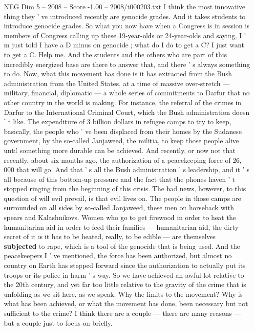 \begin{textsample}{NEG Dim 5 – 2008 – Score -1.00 – 2008/t000203.txt}
I think the most innovative thing they ' ve introduced recently are genocide grades.
And it takes students to introduce genocide grades.
So what you now have when a Congress is in session is members of Congress calling up these 19-year-olds or 24-year-olds and saying, I ' m just told I have a D minus on genocide ; what do I do to get a C?
I just want to get a C.
Help me.
And the students and the others who are part of this incredibly energized base are there to answer that, and there ' s always something to do.
Now, what this movement has done is it has extracted from the Bush administration from the United States, at a time of massive over-stretch — military, financial, diplomatic — a whole series of commitments to Darfur that no other country in the world is making.
For instance, the referral of the crimes in Darfur to the International Criminal Court, which the Bush administration doesn ' t like.
The expenditure of 3 billion dollars in refugee camps to try to keep, basically, the people who ' ve been displaced from their homes by the Sudanese government, by the so-called Janjaweed, the militia, to keep those people alive until something more durable can be achieved.
And recently, or now not that recently, about six months ago, the authorization of a peacekeeping force of 26, 000 that will go.
And that ' s all the Bush administration ' s leadership, and it ' s all because of this bottom-up pressure and the fact that the phones haven ' t stopped ringing from the beginning of this crisis.
The bad news, however, to this question of will evil prevail, is that evil lives on.
The people in those camps are surrounded on all sides by so-called Janjaweed, these men on horseback with spears and Kalashnikovs.
Women who go to get firewood in order to heat the humanitarian aid in order to feed their families — humanitarian aid, the dirty secret of it is it has to be heated, really, to be edible — are themselves \textbf{subjected} to rape, which is a tool of the genocide that is being used.
And the peacekeepers I ' ve mentioned, the force has been authorized, but almost no country on Earth has stepped forward since the authorization to actually put its troops or its police in harm ' s way.
So we have achieved an awful lot relative to the 20th century, and yet far too little relative to the gravity of the crime that is unfolding as we sit here, as we speak.
Why the limits to the movement?
Why is what has been achieved, or what the movement has done, been necessary but not sufficient to the crime?
I think there are a couple — there are many reasons — but a couple just to focus on briefly.

\end{textsample}
